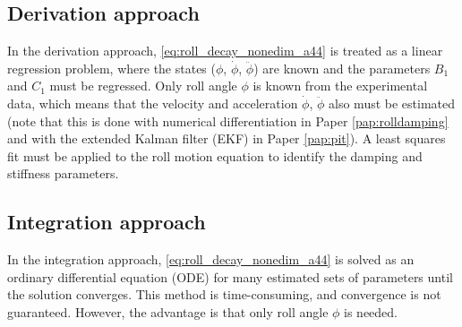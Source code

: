 \subsection{Derivation approach}\label{sec:derivation_approach}
In the derivation approach, \autoref{eq:roll_decay_nonedim_a44} is treated as a linear regression problem, where the states ($\phi$, $\dot{\phi}$, $\ddot{\phi}$) are known and the parameters $B_1$ and $C_1$ must be regressed. Only roll angle $\phi$ is known from the experimental data, which means that the velocity and acceleration $\dot{\phi}$, $\ddot{\phi}$ also must be estimated (note that this is done with numerical differentiation in Paper \ref{pap:rolldamping} and with the extended Kalman filter (EKF) in Paper \ref{pap:pit}).
A least squares fit must be applied to the roll motion equation to identify the damping and stiffness parameters.

\subsection{Integration approach}\label{sec:integration_approach}
In the integration approach, \autoref{eq:roll_decay_nonedim_a44} is solved as an ordinary differential equation (ODE) for many estimated sets of parameters until the solution converges. This method is time-consuming, and convergence is not guaranteed. However, the advantage is that only roll angle $\phi$ is needed.


